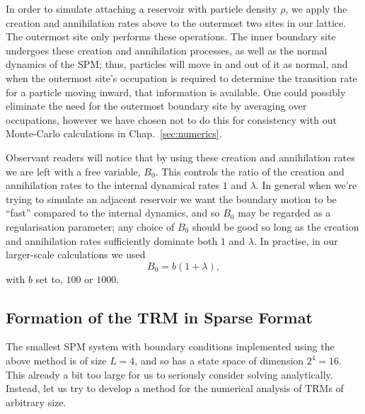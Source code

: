 In order to simulate attaching a reservoir with particle density $\rho$, we apply
the creation and annihilation rates above to the outermost two sites in our lattice.
The outermost site only performs these operations. The inner boundary site undergoes
these creation and annihilation processes, as well as the normal dynamics of the SPM;
thus, particles will move in and out of it as normal, and when the outermost site's
occupation is required to determine the transition rate for a particle moving inward,
that information is available. One could possibly eliminate the need for the outermost
boundary site by averaging over occupations, however we have chosen not to do this for
consistency with out Monte-Carlo calculations in Chap.~\ref{sec:numerics}.

Observant readers will notice that by using these creation and annihilation rates we
are left with a free variable, $B_0$. This controls the ratio of the creation and
annihilation rates to the internal dynamical rates $1$ and $\lambda$. In general
when we're trying to simulate an adjacent reservoir we want the boundary motion to be
``fast'' compared to the internal dynamics, and so $B_0$ may be regarded as a
regularisation parameter; any choice of $B_0$ should be good so long as
the creation and annihilation rates sufficiently dominate both $1$ and $\lambda$.
In practise, in our larger-scale calculations we  used
\begin{equation}
 B_0 = b(1+\lambda),
\end{equation}
with $b$ set to, $100$ or $1000$.

\subsection{Formation of the TRM in Sparse Format}

The smallest SPM system with boundary conditions implemented using the above method is
of size $L=4$, and so has a state space of dimension $2^4=16$. This already a bit too large for us to seriously consider solving analytically. Instead, let us try to develop
a method for the numerical analysis of TRMs of arbitrary size.

